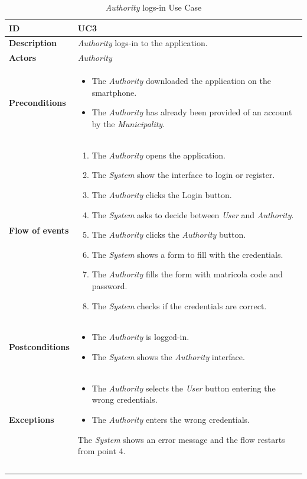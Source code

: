 \documentclass {article}
\begin{document}
	\begin{longtable}{| p{3 cm} | p{10.5 cm} |} 
			\hline
			{\bf ID} & UC3 \\
			\hline
			{\bf Description} & {\it Authority} logs-in to the application. \\
			\hline
			{\bf Actors} & {\it Authority} \\
			\hline
			{\bf Preconditions} & 	
			\begin{itemize}
				\item The {\it Authority} downloaded the application on the smartphone.
				\item The {\it Authority} has already been provided of an account by the {\it Municipality}.
			\end{itemize}
			\\
			\hline
			{\bf Flow of events} &	
			\begin{enumerate}
				\item The {\it Authority} opens the application.
				\item The {\it System} show the interface to login or register.
				\item The {\it Authority} clicks the Login button.
				\item The {\it System} asks to decide between {\it User} and {\it Authority}.
				\item The {\it Authority} clicks the {\it Authority} button.
				\item The {\it System} shows a form to fill with the credentials.
				\item The {\it Authority} fills the form with matricola code and password.
				\item The {\it System} checks if the credentials are correct.
			\end{enumerate}
			\\
			\hline
			{\bf Postconditions} & 
			\begin{itemize}
				\item The {\it Authority} is logged-in.
				\item The {\it System} shows the {\it Authority} interface.
			\end{itemize}
			\\
			\hline
			{\bf Exceptions} & 	
			\begin{itemize}
				\item The {\it Authority} selects the {\it User} button entering the wrong credentials.
				\item The {\it Authority} enters the wrong credentials.
			\end{itemize}
			The {\it System} shows an error message and the flow restarts from point 4.
			\\ \\
			\hline
			\caption{{\it Authority} logs-in Use Case}
			\end{longtable}
\end{document}

